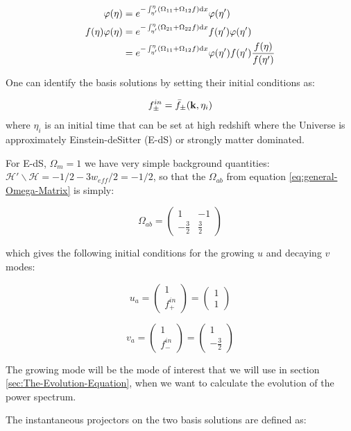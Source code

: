 \begin{align*}
\varphi(\eta) & =e^{-\int_{\eta'}^{\eta}(\Omega_{11}+\Omega_{12}f)\mathrm{d} x}\varphi(\eta')\\
f(\eta)\varphi(\eta) & =e^{-\int_{\eta'}^{\eta}(\Omega_{21}+\Omega_{22}f)\mathrm{d} x}f(\eta')\varphi(\eta')\\
 & =e^{-\int_{\eta'}^{\eta}(\Omega_{11}+\Omega_{12}f)\mathrm{d} x}\varphi(\eta')f(\eta')\frac{f(\eta)}{f(\eta')}
\end{align*}


One can identify the basis solutions by setting their initial conditions
as:

\[
f_{\pm}^{in}=\bar{f}_{\pm}(\mathbf{k},\eta_{i})
\]
where $\eta_{i}$ is an initial time that can be set at high redshift
where the Universe is approximately Einstein-deSitter (E-dS) or strongly
matter dominated.

For E-dS, $\Omega_{m}=1$ we have very simple background quantities:
$\mathcal{H}'\backslash\mathcal{H}=-1/2-3w_{eff}/2=-1/2$, so that
the $\Omega_{ab}$ from equation \ref{eq:general-Omega-Matrix} is
simply:

\[
\Omega_{ab}=\begin{pmatrix}1 & -1\\
-\frac{3}{2} & \frac{3}{2}
\end{pmatrix}
\]


which gives the following initial conditions for the growing $u$
and decaying $v$ modes:

\[
u_{a}=\begin{pmatrix}1\\
f_{+}^{in}
\end{pmatrix}=\begin{pmatrix}1\\
1
\end{pmatrix}
\]


\[
v_{a}=\begin{pmatrix}1\\
f_{-}^{in}
\end{pmatrix}=\begin{pmatrix}1\\
-\frac{3}{2}
\end{pmatrix}
\]


The growing mode will be the mode of interest that we will use in
section \ref{sec:The-Evolution-Equation}, when we want to calculate
the evolution of the power spectrum.

The instantaneous projectors on the two basis solutions are defined
as:

